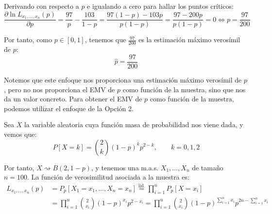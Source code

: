 \begin{ejercicio}
\begin{description}
        Derivando con respecto a $p$ e igualando a cero para hallar los puntos críticos:
        \begin{equation*}
            \dfrac{\partial \ln L_{x_1,\ldots,x_n}(p)}{\partial p} = \frac{97}{p} - \frac{103}{1-p} = \frac{97(1-p)-103p}{p(1-p)} = \frac{97 - 200p}{p(1-p)} = 0 \Longleftrightarrow p = \frac{97}{200}
        \end{equation*}

        Por tanto, como $p\in [0,1]$, tenemos que $\frac{97}{200}$ es la estimación máximo verosímil de $p$:
        \begin{equation*}
            \widehat{p} = \frac{97}{200}
        \end{equation*}

        Notemos que este enfoque nos proporciona una estimación máximo verosímil de $p$, pero no nos proporciona el EMV de $p$ como función de la muestra, sino que nos da un valor concreto. Para obtener el EMV de $p$ como función de la muestra, podemos utilizar el enfoque de la Opción 2.
        
        
        \item[Opción 2.] Sea $X$ la variable aleatoria cuya función masa de probabilidad nos viene dada, y vemos que:
        \begin{equation*}
            P[X=k] = \binom{2}{k}(1-p)^kp^{2-k}, \qquad k=0,1,2
        \end{equation*}

        Por tanto, $X\rightsquigarrow B(2,1-p)$, y tenemos una m.a.s. $X_1, \ldots, X_n$ de tamaño $n=100$. La función de verosimilitud asociada a la muestra es:
        \begin{align*}
            L_{x_1,\ldots,x_n}(p) &= P_p[X_1=x_1, \ldots, X_n = x_n] \stackrel{\text{iid.}}{=}\prod_{i=1}^{n}P_p[X=x_i]\\ 
                                &= \prod_{i=1}^{n}\binom{2}{x_i}(1-p)^{x_i}p^{2-x_i} = \prod_{i=1}^{n}\binom{2}{x_i}(1-p)^{\sum\limits_{i=1}^{n}x_i}p^{2n-\sum\limits_{i=1}^{n}x_i}
        \end{align*}


\end{description}
\end{ejercicio}
